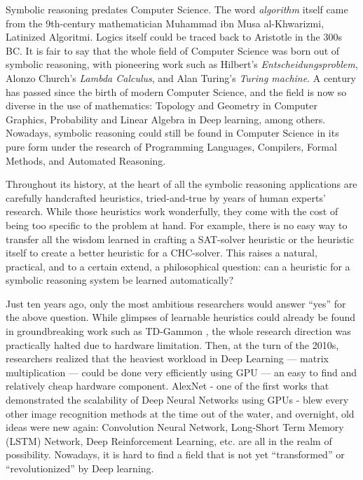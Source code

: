 Symbolic reasoning predates Computer Science. The word \emph{algorithm} itself came from the 9th-century mathematician Muhammad ibn Musa al-Khwarizmi, Latinized Algoritmi. Logics itself could be traced back to Aristotle in the 300s BC. It is fair to say that the whole field of Computer Science was born out of symbolic reasoning, with pioneering work such as Hilbert's \emph{Entscheidungsproblem}, Alonzo Church's \emph{Lambda Calculus}, and Alan Turing's \emph{Turing machine}.
A century has passed since the birth of modern Computer Science, and the field is now so diverse in the use of mathematics: Topology and Geometry in Computer Graphics, Probability and Linear Algebra in Deep learning, among others.
Nowadays, symbolic reasoning could still be found in Computer Science in its pure form under the research of Programming Languages, Compilers, Formal Methods, and Automated Reasoning. 

Throughout its history, at the heart of all the symbolic reasoning applications are carefully handcrafted heuristics, tried-and-true by years of human experts' research. While those heuristics work wonderfully, they come with the cost of being too specific to the problem at hand. For example, there is no easy way to transfer all the wisdom learned in crafting a SAT-solver heuristic or the heuristic itself to create a better heuristic for a CHC-solver. This raises a natural, practical, and to a certain extend, a philosophical question: can a heuristic for a symbolic reasoning system be learned automatically?

Just ten years ago, only the most ambitious researchers would answer ``yes'' for the above question. While glimpses of learnable heuristics could already be found in groundbreaking work such as TD-Gammon \cite{td-gammon}, the whole research direction was practically halted due to hardware limitation. Then, at the turn of the 2010s, researchers realized that the heaviest workload in Deep Learning --- matrix multiplication --- could be done very efficiently using GPU --- an easy to find and relatively cheap hardware component. AlexNet \cite{Krizhevsky:nips12} - one of the first works that demonstrated the scalability of Deep Neural Networks using GPUs - blew every other image recognition methods at the time out of the water, and overnight, old ideas were new again: Convolution Neural Network, Long-Short Term Memory (LSTM) Network, Deep Reinforcement Learning, etc. are all in the realm of possibility. Nowadays, it is hard to find a field that is not yet ``transformed'' or ``revolutionized'' by Deep learning.

